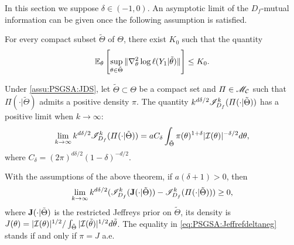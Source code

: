 In this section we suppose $\delta\in(-1,0)$. 
An asymptotic limit of the $D_f$-mutual information can be given once the following assumption is satisfied.
\begin{assu}
    \label{assu:PSGSA:JDS}
        For every compact subset $\tilde\Theta$ of $\Theta$,
        there exist $K_0$ such that the quantity 
            \begin{equation}
                \mathbb{E}_\theta\left[\sup_{\theta\in\tilde\Theta}\|\nabla^2_\theta\log\ell(Y_1|\tilde\theta)\|\right] \leq K_0.
            \end{equation}
    \end{assu}


\begin{thm}\label{thm:refcompactneg}
    Under \cref{assu:PSGSA:JDS}, let $\tilde\Theta\subset\Theta$ be a compact set and $\varPi\in\mathscr{M}_{\mathcal{C}}$ such that $\varPi(\cdot|\tilde\Theta)$ admits a positive density $\pi$. 
    The quantity $k^{d\delta/2}\mathscr{I}^k_{D_f}(\varPi(\cdot|\tilde\Theta))$ has a positive limit when $k\to\infty$:
    \begin{align}
    \label{eq:limitkbeta}
            \lim_{k\rightarrow\infty} k^{d\delta/2} \mathscr{I}^k_{D_f}(\varPi(\cdot|\tilde\Theta)) = 
    a C_\delta \int_{\tilde\Theta}\pi(\theta)^{1+\delta} |\mathcal{I}(\theta)|^{-\delta/2}  d\theta ,
        \end{align}
    where $ C_\delta = (2\pi)^{d\delta/2} (1-\delta)^{-d/2}$. 
    \end{thm}

\begin{prop}\label{prop:JlimIMdeltaneg}
    With the assumptions of the above theorem,  if $a(\delta+1)>0$, then
        \begin{equation}\label{eq:PSGSA:Jeffrefdeltaneg}
            \lim_{k\rightarrow\infty}k^{d\delta/2}(\mathscr{I}^k_{D_f}(\mathbf{J}(\cdot|\tilde\Theta))-\mathscr{I}_{D_f}^k(\varPi(\cdot|\tilde\Theta)))\geq 0 ,
        \end{equation}
    where $\mathbf{J}(\cdot|\tilde\Theta)$ is the restricted Jeffreys prior on $\tilde\Theta$, its density is $J(\theta)=|\mathcal{I}(\theta)|^{1/2}/\int_{\tilde\Theta}|\mathcal{I}(\tilde\theta)|^{1/2}d\tilde\theta$.
    The equality in \cref{eq:PSGSA:Jeffrefdeltaneg} stands if and only if 
    {$\pi=J$} a.e.
\end{prop}


